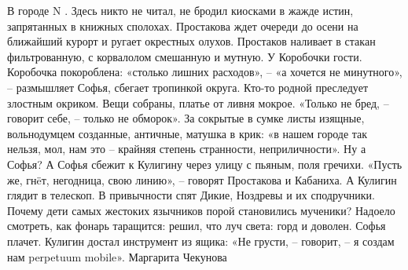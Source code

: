 В городе N
.
Здесь никто не читал, не бродил киосками
в жажде истин, запрятанных в книжных сполохах.
Простакова ждет очереди до осени 
на ближайший курорт и ругает окрестных олухов.
Простаков наливает в стакан фильтрованную,
с корвалолом смешанную и мутную. 
У Коробочки гости. Коробочка покороблена:
«столько лишних расходов», –  
«а хочется не минутного», – размышляет Софья, 
сбегает тропинкой округа. 
Кто-то родной преследует злостным окриком. 
Вещи собраны, платье от ливня мокрое.
 «Только не бред, – говорит себе, – только не обморок».
За сокрытые в сумке листы изящные, 
вольнодумцем созданные, античные,
матушка в крик: «в нашем городе так нельзя, мол, нам
 это – крайняя степень странности, неприличности».
Ну а Софья? А Софья сбежит к Кулигину
через улицу с пьяным, поля гречихи.
«Пусть же, гнëт, негодница, свою линию», –
говорят Простакова и Кабаниха.
А Кулигин глядит в телескоп. В привычности
спят Дикие, Ноздревы и их сподручники.
Почему дети самых жестоких язычников
порой становились мученики?
Надоело смотреть, как фонарь таращится:
решил, что луч света: горд и доволен.
Софья плачет. Кулигин достал инструмент из ящика:
«Не грусти, – говорит, – я создам нам
perpetuum mobile».
Маргарита Чекунова

